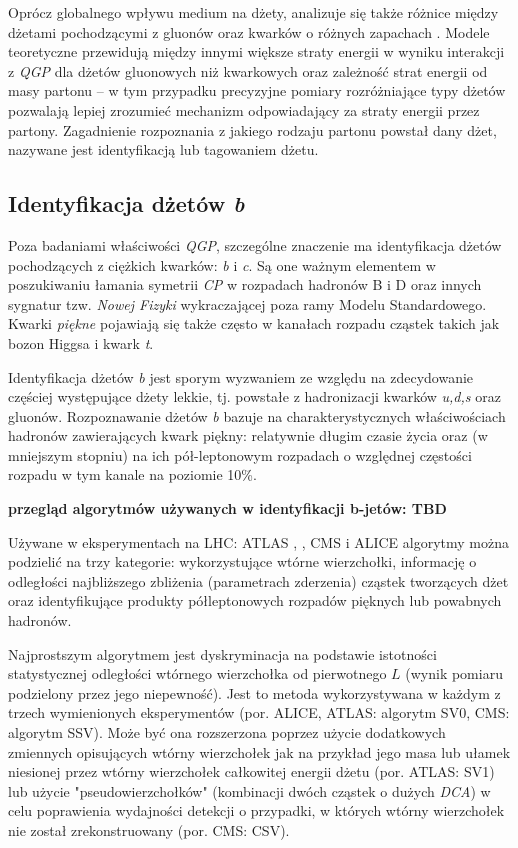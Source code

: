 Oprócz globalnego wpływu medium na dżety, analizuje się także różnice między dżetami pochodzącymi z gluonów oraz kwarków o różnych zapachach . Modele teoretyczne przewidują między innymi większe straty energii w wyniku interakcji z \textit{QGP} dla dżetów gluonowych niż kwarkowych \cite{Salgado:2003gb} oraz zależność strat energii od masy partonu \cite{Dokshitzer:2001zm} -- w tym przypadku precyzyjne pomiary rozróżniające typy dżetów pozwalają lepiej zrozumieć mechanizm odpowiadający za straty energii przez partony. Zagadnienie rozpoznania z jakiego rodzaju partonu powstał dany dżet, nazywane jest identyfikacją lub tagowaniem dżetu.


\subsection{Identyfikacja dżetów \textit{b}}
\label{subsec:b-dzety}

Poza badaniami właściwości \textit{QGP}, szczególne znaczenie ma identyfikacja dżetów pochodzących z ciężkich kwarków: \textit{b} i \textit{c}.
Są one ważnym elementem w poszukiwaniu łamania symetrii \textit{CP} w rozpadach hadronów B i D oraz innych sygnatur tzw. \textit{Nowej Fizyki} wykraczającej poza ramy Modelu Standardowego. 
Kwarki \textit{piękne} pojawiają się także często w kanałach rozpadu cząstek takich jak bozon Higgsa i kwark \textit{t}.

Identyfikacja dżetów \textit{b} jest sporym wyzwaniem ze względu na zdecydowanie częściej występujące dżety lekkie, tj. powstałe z hadronizacji kwarków \textit{u,d,s} oraz gluonów.
Rozpoznawanie dżetów \textit{b} bazuje na charakterystycznych właściwościach hadronów zawierających kwark piękny: relatywnie długim czasie życia oraz (w mniejszym stopniu) na ich pół-leptonowym rozpadach o względnej częstości rozpadu w tym kanale  na poziomie 10\%.

\textbf{przegląd algorytmów używanych w identyfikacji b-jetów: TBD} 

Używane w eksperymentach na LHC: ATLAS \cite{Aad:2015ydr}, \cite{Sirunyan:2017ezt}, CMS i ALICE algorytmy można podzielić na trzy kategorie: wykorzystujące wtórne wierzchołki,  informację o odległości najbliższego zbliżenia (parametrach zderzenia)  cząstek tworzących dżet oraz identyfikujące produkty półleptonowych rozpadów pięknych lub powabnych hadronów.

Najprostszym algorytmem jest dyskryminacja na podstawie istotności statystycznej odległości wtórnego wierzchołka od pierwotnego $L$ (wynik pomiaru podzielony przez jego niepewność). Jest to metoda wykorzystywana w  każdym z trzech wymienionych eksperymentów (por. ALICE, ATLAS: algorytm SV0, CMS: algorytm SSV). 
Może być ona rozszerzona poprzez użycie dodatkowych zmiennych opisujących wtórny wierzchołek jak na przykład jego masa lub ułamek niesionej przez wtórny wierzchołek całkowitej energii dżetu (por. ATLAS: SV1) lub użycie "pseudowierzchołków" (kombinacji dwóch cząstek o dużych \textit{DCA}) w celu poprawienia wydajności detekcji o przypadki, w których wtórny wierzchołek nie został zrekonstruowany (por. CMS: CSV).

